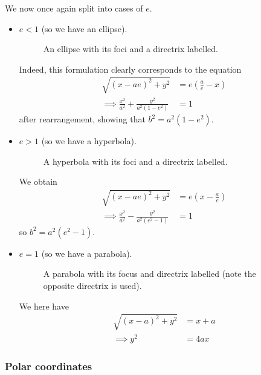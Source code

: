 \documentclass{../template/note}
\begin{document}
    We now once again split into cases of \(e\).

    \begin{itemize}
        \item \(e < 1\) (so we have an ellipse).
        \begin{figure}[ht]
            \centering
            \caption{An ellipse with its foci and a directrix labelled.}
            \label{fig:focus-directrix-ellipse}
        \end{figure}
        Indeed, this formulation clearly corresponds to the equation
        \begin{align*}
            \sqrt{(x-ae)^2+y^2}&=e\left(\frac a e - x\right) \\
            \implies\frac{x^2}{a^2} + \frac{y^2}{a^2(1-e^2)} &= 1
        \end{align*}
        after rearrangement, showing that \(b^2 = a^2(1-e^2)\).
        \item \(e > 1\) (so we have a hyperbola).
        \begin{figure}[H]
            \centering
            \caption{A hyperbola with its foci and a directrix labelled.}
            \label{fig:focus-directrix-hyperbola}
        \end{figure}
        We obtain
        \begin{align*}
            \sqrt{(x-ae)^2+y^2} &= e\left(x-\frac a e\right) \\
            \implies\frac{x^2}{a^2} - \frac{y^2}{a^2(e^2-1)} &= 1
        \end{align*}
        so \(b^2 = a^2(e^2-1)\).
        \item \(e = 1\) (so we have a parabola).
        \begin{figure}[ht]
            \centering
            \caption{A parabola with its focus and directrix labelled (note the opposite directrix is used).}
            \label{fig:focus-directrix-parabola}
        \end{figure}
        We here have
        \begin{align*}
            \sqrt{(x-a)^2+y^2} &= x+a \\
            \implies y^2 &= 4ax
        \end{align*}
    \end{itemize}

    \subsubsection{Polar coordinates}
    
\end{document}

